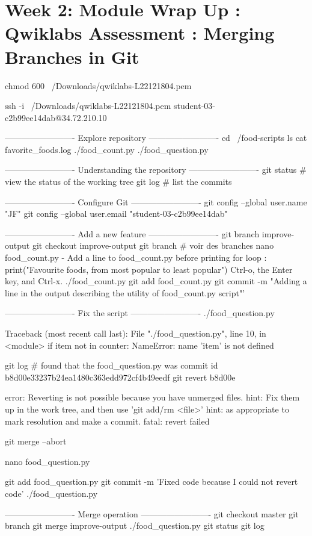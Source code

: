 \documentclass[11pt, onecolumn]{article}
\begin{document}
\section{Week 2: Module Wrap Up : Qwiklabs Assessment : Merging Branches in Git}

chmod 600 ~/Downloads/qwiklabs-L22121804.pem

ssh -i ~/Downloads/qwiklabs-L22121804.pem student-03-c2b99ee14dab@34.72.210.10

-------------------------
Explore repository
-------------------------
cd ~/food-scripts
ls
cat favorite_foods.log
./food_count.py
./food_question.py

-------------------------
Understanding the repository
-------------------------
git status   # view the status of the working tree
git log   # list the commits


-------------------------
Configure Git
-------------------------
git config --global user.name "JF"
git config --global user.email "student-03-c2b99ee14dab"

-------------------------
Add a new feature
-------------------------
git branch improve-output
git checkout improve-output
git branch  # voir des branches
nano food_count.py
- Add a line to food_count.py before printing for loop : print("Favourite foods, from most popular to least popular")
Ctrl-o, the Enter key, and Ctrl-x.
./food_count.py
git add food_count.py
git commit -m "Adding a line in the output describing the utility of food_count.py script"'


-------------------------
Fix the script
-------------------------
./food_question.py

Traceback (most recent call last):
  File "./food_question.py", line 10, in <module>
    if item not in counter:
NameError: name 'item' is not defined

git log   # found that the food_question.py was commit id b8d00e33237b24ea1480c363edd972cf4b49eedf
git revert b8d00e

error: Reverting is not possible because you have unmerged files.
hint: Fix them up in the work tree, and then use 'git add/rm <file>'
hint: as appropriate to mark resolution and make a commit.
fatal: revert failed

git merge --abort

nano food_question.py

git add food_question.py
git commit -m 'Fixed code because I could not revert code'
./food_question.py

-------------------------
Merge operation
-------------------------
git checkout master
git branch
git merge improve-output
./food_question.py
git status
git log
\end{document}
